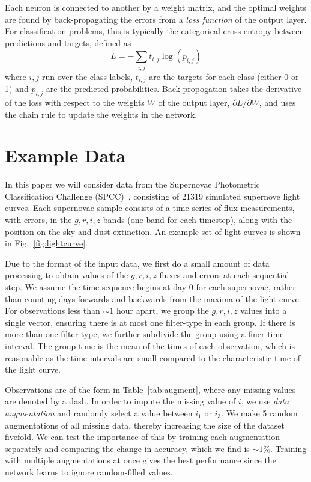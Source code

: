 \documentclass[twocolumn]{aastex61}
\begin{document}
 Each neuron is connected to another by a weight matrix, and the optimal weights are found by back-propagating the errors from a {\em loss function} of the output layer. For classification problems, this is typically the categorical cross-entropy between predictions and targets, defined as 
\begin{equation}
L= -\sum_{i,j} t_{i,j} \log \left( p_{i,j} \right)
\end{equation}
where $i,j$ run over the class labels, $t_{i,j}$ are the targets for each class (either 0 or 1) and $p_{i,j}$ are the predicted probabilities. Back-propogation takes the derivative of the loss with respect to the weights $W$ of the output layer, $\partial L/\partial W$, and uses the chain rule to update the weights in the network.

\section{Example Data}

In this paper we will consider data from the Supernovae Photometric Classification Challenge (SPCC)~\cite{Kessler:2010wk,Kessler:2010qj}, consisting of 21319 simulated supernove light curves.  Each supernovae sample consists of a time series of flux measurements, with errors, in the $g,r,i,z$ bands (one band for each timestep), along with the position on the sky and dust extinction. An example set of light curves is shown in Fig.~\ref{fig:lightcurve}. 

Due to the format of the input data, we first do a small amount of data processing to obtain values of the $g,r,i,z$ fluxes and errors at each sequential step.  We assume the time sequence begins at day 0 for each supernovae, rather than counting days forwards and backwards from the maxima of the light curve. For observations less than $\sim1$ hour apart, we group the $g,r,i,z$ values into a single vector, ensuring there is at most one filter-type in each group. If there is more than one filter-type, we further subdivide the group using a finer time interval.  The group time is the mean of the times of each observation, which is reasonable as the time intervals are small compared to the characteristic time of the light curve. 

 Observations are of the form in Table~\ref{tab:augment}, where any missing values are denoted by a dash. In order to impute the missing value of $i$, we use {\em data augmentation} and randomly select a value between $i_1$ or $i_3$. We make 5 random augmentations of all missing data, thereby increasing the size of the dataset fivefold. We can test the importance of this by training each augmentation separately and comparing the change in accuracy, which we find is $\sim 1\%$. Training with multiple augmentations at once gives the best performance since the network learns to ignore random-filled values. 
\end{document}
